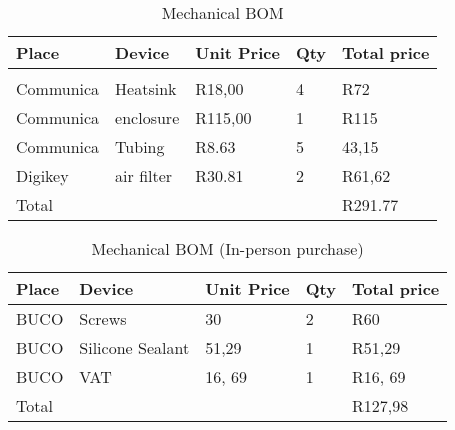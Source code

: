 \documentclass[class=report,11pt,crop=false]{standalone}
\begin{document}
\begin{table}
\centering

\begin{tabular}{|l |l |l |l |l|} \hline 
Place & Device & Unit Price & Qty & Total price \\ \hline 
 &  &  &  &  \\ \hline 
Communica & Heatsink & R18,00 & 4 & R72 \\ \hline 
Communica & enclosure & R115,00 & 1 & R115 \\ \hline 
Communica & Tubing & R8.63 & 5 & 43,15 \\ \hline 
Digikey & air filter & R30.81 & 2 & R61,62 \\ \hline 
Total &  &  &  & R291.77 \\ \hline

\end{tabular}
\caption{Mechanical BOM }
\label{tab: Mechanical BOM (Online)}
\end{table}

 

\begin{table}
\centering

\begin{tabular}{|l |l |l |l |l|} \hline 
Place & Device & Unit Price & Qty & Total price \\ \hline 
BUCO & Screws & 30 & 2 & R60 \\ \hline 
BUCO & Silicone Sealant & 51,29 & 1 & R51,29 \\ \hline 
BUCO & VAT & 16, 69 & 1 & R16, 69 \\ \hline 
Total &  &  &  & R127,98 \\ \hline

\end{tabular}
\caption{Mechanical BOM (In-person purchase)}
\label{tab:Mechanical BOM (In-person purchase)}
\end{table}


\ifstandalone

\printnoidxglossary[type=\acronymtype,nonumberlist]
\fi
\end{document}
